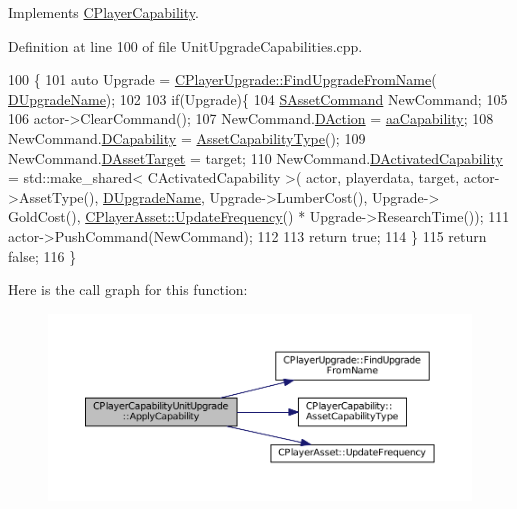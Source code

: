 Implements \hyperlink{classCPlayerCapability_a2ca6fd7fbd9c0178f1cf1d049c63825f}{C\+Player\+Capability}.



Definition at line 100 of file Unit\+Upgrade\+Capabilities.\+cpp.


\begin{DoxyCode}
100                                                                                                            
                                                               \{
101     \textcolor{keyword}{auto} Upgrade = \hyperlink{classCPlayerUpgrade_af47a08aba3a1a5b2cefacef24065a82e}{CPlayerUpgrade::FindUpgradeFromName}(
      \hyperlink{classCPlayerCapabilityUnitUpgrade_a5de8bffd6935c699f431329ad4ee5eec}{DUpgradeName});
102     
103     \textcolor{keywordflow}{if}(Upgrade)\{
104         \hyperlink{structSAssetCommand}{SAssetCommand} NewCommand;
105         
106         actor->ClearCommand();
107         NewCommand.\hyperlink{structSAssetCommand_a8edd3b3d59a76d5514ba403bc8076a75}{DAction} = \hyperlink{GameDataTypes_8h_ab47668e651a3032cfb9c40ea2d60d670acf9fb164e8abd71c71f4a8c7fda360d4}{aaCapability};
108         NewCommand.\hyperlink{structSAssetCommand_a734ea7c6847457b437360f333f570ff9}{DCapability} = \hyperlink{classCPlayerCapability_a433bb196cd6ab6a932f1cac102b3aa98}{AssetCapabilityType}();
109         NewCommand.\hyperlink{structSAssetCommand_a3d9b43f6e59c386c48c41a65448a0c39}{DAssetTarget} = target;
110         NewCommand.\hyperlink{structSAssetCommand_ad8beda19520811cc70fe1eab16c774dd}{DActivatedCapability} = std::make\_shared< CActivatedCapability >(
      actor, playerdata, target, actor->AssetType(), \hyperlink{classCPlayerCapabilityUnitUpgrade_a5de8bffd6935c699f431329ad4ee5eec}{DUpgradeName}, Upgrade->LumberCost(), Upgrade->
      GoldCost(), \hyperlink{classCPlayerAsset_a0aff85b9552967a42f4f3f42cb59c19f}{CPlayerAsset::UpdateFrequency}() * Upgrade->ResearchTime());
111         actor->PushCommand(NewCommand);
112         
113         \textcolor{keywordflow}{return} \textcolor{keyword}{true};
114     \}
115     \textcolor{keywordflow}{return} \textcolor{keyword}{false};
116 \}
\end{DoxyCode}
Here is the call graph for this function\+:
\nopagebreak
\begin{figure}[H]
\begin{center}
\leavevmode
\includegraphics[width=350pt]{classCPlayerCapabilityUnitUpgrade_a8cc6fee17dd178fd798e36c3d5301e9d_cgraph}
\end{center}
\end{figure}
